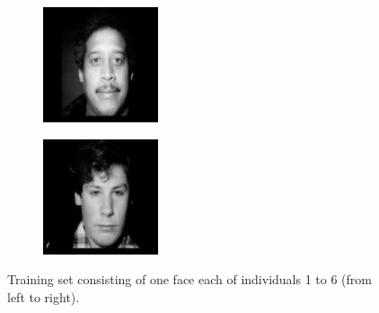 \begin{figure}[ht]
\begin{subfigure}[b]{0.15\textwidth}
  \end{subfigure}
  \hfill
  \begin{subfigure}[b]{0.15\textwidth}
    \centering
    \includegraphics[width=\textwidth]{images/q3_face_5a.png}
  \end{subfigure}
  \hfill
  \begin{subfigure}[b]{0.15\textwidth}
    \centering
    \includegraphics[width=\textwidth]{images/q3_face_6a.png}
  \end{subfigure}
  \caption{Training set consisting of one face each of individuals 1 to 6 (from left to right).}
  \label{fig:training_imgs}
\end{figure}


